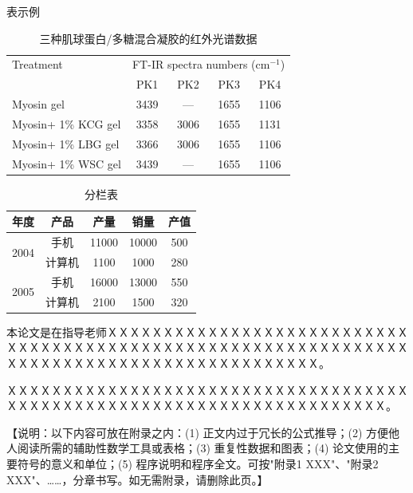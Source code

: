 \documentclass[a4paper]{ltxdoc}
\begin{document}
{\clearpage
表示例
\begin{table}[!htb]
\centering
\caption{三种肌球蛋白/多糖混合凝胶的红外光谱数据}
\begin{tabular}{lcccc}
\hline
Treatment           & \multicolumn{4}{c}{FT-IR spectra numbers (cm$^{−1}$)} \\ \cline{2-5} 
                    & PK1        & PK2        & PK3        & PK4       \\ \hline
Myosin gel          & 3439       & —          & 1655       & 1106      \\
Myosin+ 1\% KCG gel & 3358       & 3006       & 1655       & 1131      \\
Myosin+ 1\% LBG gel & 3366       & 3006       & 1655       & 1106      \\
Myosin+ 1\% WSC gel & 3439       & —          & 1655       & 1106      \\ \hline
\end{tabular}
\end{table}

\begin{table}[!htb]
\centering
\caption{分栏表}
\begin{tabular}{ccccc}
\hline
年度                    & 产品  & 产量    & 销量    & 产值  \\ \hline
\multirow{2}{*}{2004} & 手机  & 11000 & 10000 & 500 \\
                      & 计算机 & 1100  & 1000  & 280 \\ \hline
\multirow{2}{*}{2005} & 手机  & 16000 & 13000 & 550 \\
                      & 计算机 & 2100  & 1500  & 320 \\ \hline
\end{tabular}
\end{table}
}

{
\clearpage %
\nocite{*} %
}

\begin{acknowledge}
本论文是在指导老师ＸＸＸＸＸＸＸＸＸＸＸＸＸＸＸＸＸＸＸＸＸＸＸＸＸＸＸＸＸＸＸＸＸＸＸＸＸＸＸＸＸＸＸＸＸＸＸＸＸＸＸＸＸＸＸＸＸＸＸＸＸＸＸＸＸＸＸＸＸＸＸＸＸＸＸＸＸＸＸＸＸＸＸＸＸＸＸＸＸＸＸ。

ＸＸＸＸＸＸＸＸＸＸＸＸＸＸＸＸＸＸＸＸＸＸＸＸＸＸＸＸＸＸＸＸＸＸＸＸＸＸＸＸＸＸＸＸＸＸＸＸＸＸＸＸＸＸＸＸＸＸＸＸＸＸＸＸＸＸＸＸＸＸ。
\end{acknowledge}

\begin{appendix}
【说明：以下内容可放在附录之内：(1) 正文内过于冗长的公式推导；(2) 方便他人阅读所需的辅助性数学工具或表格；(3) 重复性数据和图表；(4) 论文使用的主要符号的意义和单位；(5) 程序说明和程序全文。可按"附录1  XXX"、"附录2  XXX"、……，分章书写。如无需附录，请删除此页。】
\end{appendix}
\end{document}
